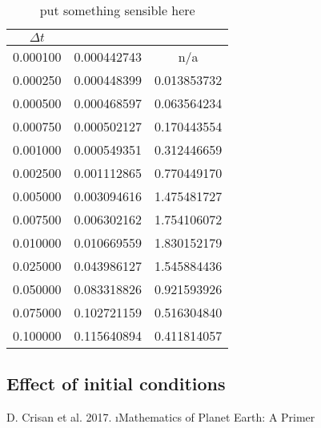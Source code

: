 \documentclass[10pt]{article}
\begin{document}
\begin{table}[H]
	\centering
		\begin{tabular}{|c|c|c|}
			\hline
							$\Delta t$        & \text{Error}		&	\text{Gradient}\\
			\hline
                                0.000100        & 0.000442743 & n/a \\ 
			\hline
                                0.000250        & 0.000448399 & 0.013853732 \\ 
			\hline
                                0.000500        & 0.000468597 & 0.063564234 \\ 
			\hline
                                0.000750        & 0.000502127 & 0.170443554 \\ 
			\hline
                                0.001000        & 0.000549351 & 0.312446659 \\ 
			\hline
                                0.002500        & 0.001112865 & 0.770449170 \\ 
			\hline
                                0.005000        & 0.003094616 & 1.475481727 \\ 
			\hline
                                0.007500        & 0.006302162 & 1.754106072 \\ 
			\hline
                                0.010000        & 0.010669559 & 1.830152179 \\ 
			\hline
                                0.025000        & 0.043986127 & 1.545884436 \\ 
			\hline
                                0.050000        & 0.083318826 & 0.921593926 \\ 
			\hline
                                0.075000        & 0.102721159 & 0.516304840 \\ 
			\hline
                                0.100000        & 0.115640894 & 0.411814057 \\ 
              \hline
		\end{tabular}
		\caption{put something sensible here}
\end{table}


\subsection{Effect of initial conditions}


\begin{thebibliography}{9}
	 D. Crisan et al. 2017. \i{Mathematics of Planet Earth: A Primer}
\end{thebibliography}
\end{document}
